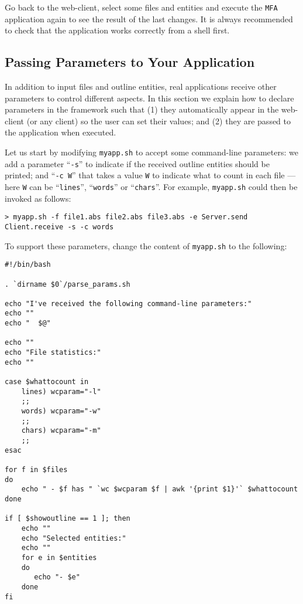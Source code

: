 Go back to the web-client, select some files and entities and execute
the \texttt{MFA} application again to see the result of the last
changes. It is always recommended to check that the application works
correctly from a shell first.

\subsection{Passing Parameters to Your Application}

In addition to input files and outline entities, real applications
receive other parameters to control different aspects. In this section
we explain how to declare parameters in the \ei framework such that
(1) they automatically appear in the web-client (or any client) so the
user can set their values; and (2) they are passed to the application
when executed.

Let us start by modifying \texttt{myapp.sh} to accept some
command-line parameters: we add a parameter ``\texttt{-s}'' to
indicate if the received outline entities should be printed; and
``\texttt{-c W}'' that takes a value \texttt{W} to indicate what to
count in each file --- here \texttt{W} can be ``\texttt{lines}'',
``\texttt{words}'' or ``\texttt{chars}''.
%
For example, \texttt{myapp.sh} could then be invoked as follows:


\medskip
\begin{lstlisting}
> myapp.sh -f file1.abs file2.abs file3.abs -e Server.send Client.receive -s -c words
\end{lstlisting}

\medskip
\noindent
To support these parameters, change the content of \texttt{myapp.sh}
to the following:

\medskip
\begin{lstlisting}[style=script]
#!/bin/bash

. `dirname $0`/parse_params.sh

echo "I've received the following command-line parameters:"
echo ""
echo "  $@"

echo ""
echo "File statistics:"
echo ""

case $whattocount in
    lines) wcparam="-l"
    ;;
    words) wcparam="-w"
    ;;
    chars) wcparam="-m"
    ;;
esac

for f in $files 
do
    echo " - $f has " `wc $wcparam $f | awk '{print $1}'` $whattocount
done

if [ $showoutline == 1 ]; then
    echo ""
    echo "Selected entities:"
    echo ""
    for e in $entities 
    do
       echo "- $e"
    done
fi
\end{lstlisting}

